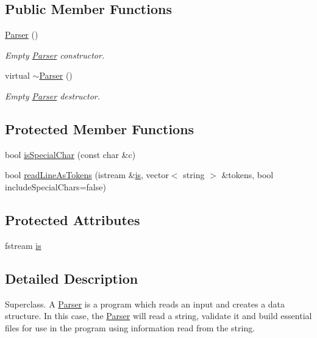\subsection*{Public Member Functions}
\begin{DoxyCompactItemize}
\item 
\hyperlink{classParser_a12234f6cd36b61af4b50c94a179422c1}{Parser} ()
\begin{DoxyCompactList}\small\item\em Empty \hyperlink{classParser}{Parser} constructor. \end{DoxyCompactList}\item 
virtual \hyperlink{classParser_ad576b92b9cc324f6f41b0269a9a1a546}{$\sim$\-Parser} ()
\begin{DoxyCompactList}\small\item\em Empty \hyperlink{classParser}{Parser} destructor. \end{DoxyCompactList}\end{DoxyCompactItemize}
\subsection*{Protected Member Functions}
\begin{DoxyCompactItemize}
\item 
bool \hyperlink{classParser_a83c7ac58f2c98cc54e9c750b29e6b0f0}{is\-Special\-Char} (const char \&c)
\item 
bool \hyperlink{classParser_ae42067f51acd49ccccb0b0373321a421}{read\-Line\-As\-Tokens} (istream \&\hyperlink{classParser_a74c323dd4798b459fa982295b8e871bc}{is}, vector$<$ string $>$ \&tokens, bool include\-Special\-Chars=false)
\end{DoxyCompactItemize}
\subsection*{Protected Attributes}
\begin{DoxyCompactItemize}
\item 
fstream \hyperlink{classParser_a74c323dd4798b459fa982295b8e871bc}{is}
\end{DoxyCompactItemize}


\subsection{Detailed Description}
Superclass. A \hyperlink{classParser}{Parser} is a program which reads an input and creates a data structure. In this case, the \hyperlink{classParser}{Parser} will read a string, validate it and build essential files for use in the program using information read from the string. 

